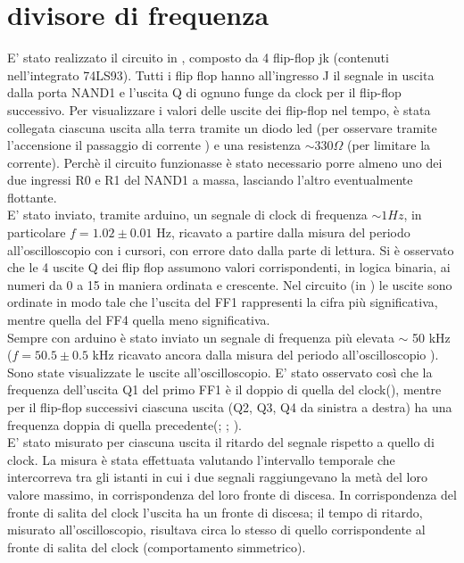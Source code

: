 \section{divisore di frequenza}
E' stato realizzato il circuito in , composto da 4 flip-flop jk (contenuti nell'integrato 74LS93). Tutti i flip flop hanno all'ingresso J il segnale in uscita dalla porta NAND1 e l'uscita Q di ognuno funge da clock per il flip-flop successivo.
Per visualizzare i valori delle uscite dei flip-flop nel tempo, è stata collegata ciascuna uscita alla terra tramite un diodo led (per osservare tramite l'accensione il passaggio di corrente ) e una resistenza $\sim 330 \Omega$ (per limitare la corrente). Perchè il circuito funzionasse è stato necessario porre almeno uno dei due ingressi R0 e R1 del NAND1 a massa, lasciando l'altro eventualmente flottante.\\
E' stato inviato, tramite arduino, un segnale di clock di frequenza $\sim 1 Hz$, in particolare $f = 1.02 \pm 0.01$ Hz, ricavato a partire dalla misura del periodo all'oscilloscopio con i cursori, con errore dato dalla parte di lettura. Si è osservato che le 4 uscite Q dei flip flop assumono valori corrispondenti, in logica binaria, ai numeri da 0 a 15 in maniera ordinata e crescente. Nel circuito (in  ) le uscite sono ordinate in modo tale che l'uscita del FF1 rappresenti la cifra più significativa, mentre  quella del FF4 quella meno significativa.\\
Sempre con arduino è stato inviato un segnale di frequenza più elevata $\sim$ 50 kHz ($f = 50.5 \pm 0.5$ kHz ricavato ancora dalla misura del periodo all'oscilloscopio ). Sono state visualizzate le uscite all'oscilloscopio. E' stato osservato così che la frequenza dell'uscita Q1 del primo FF1 è il doppio di quella del clock(), mentre per il flip-flop successivi ciascuna uscita (Q2, Q3, Q4 da sinistra a destra) ha una frequenza doppia di quella precedente(; ; ).\\
E' stato misurato per ciascuna uscita il ritardo del segnale rispetto a quello di clock. La misura è stata effettuata valutando l'intervallo temporale che intercorreva tra gli istanti in cui i due segnali raggiungevano la metà del loro valore massimo, in corrispondenza del loro fronte di discesa. In corrispondenza del fronte di salita del clock l'uscita ha un fronte di discesa; il tempo di ritardo, misurato all'oscilloscopio, risultava circa lo stesso di quello corrispondente al fronte di salita del clock (comportamento simmetrico).\\

